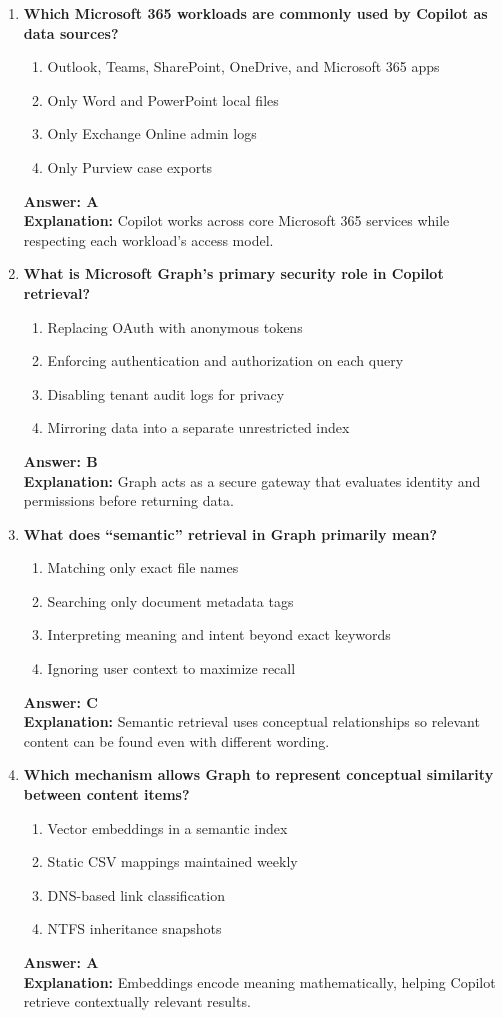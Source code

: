 \documentclass[10pt]{article}
\begin{document}
\begin{enumerate}[leftmargin=*]
\item \textbf{Which Microsoft 365 workloads are commonly used by Copilot as data sources?}
\begin{enumerate}[label=\Alph*.]
  \item Outlook, Teams, SharePoint, OneDrive, and Microsoft 365 apps
  \item Only Word and PowerPoint local files
  \item Only Exchange Online admin logs
  \item Only Purview case exports
\end{enumerate}
\textbf{Answer: A}\\
\textbf{Explanation:} Copilot works across core Microsoft 365 services while respecting each workload’s access model.

\item \textbf{What is Microsoft Graph’s primary security role in Copilot retrieval?}
\begin{enumerate}[label=\Alph*.]
  \item Replacing OAuth with anonymous tokens
  \item Enforcing authentication and authorization on each query
  \item Disabling tenant audit logs for privacy
  \item Mirroring data into a separate unrestricted index
\end{enumerate}
\textbf{Answer: B}\\
\textbf{Explanation:} Graph acts as a secure gateway that evaluates identity and permissions before returning data.

\item \textbf{What does ``semantic'' retrieval in Graph primarily mean?}
\begin{enumerate}[label=\Alph*.]
  \item Matching only exact file names
  \item Searching only document metadata tags
  \item Interpreting meaning and intent beyond exact keywords
  \item Ignoring user context to maximize recall
\end{enumerate}
\textbf{Answer: C}\\
\textbf{Explanation:} Semantic retrieval uses conceptual relationships so relevant content can be found even with different wording.

\item \textbf{Which mechanism allows Graph to represent conceptual similarity between content items?}
\begin{enumerate}[label=\Alph*.]
  \item Vector embeddings in a semantic index
  \item Static CSV mappings maintained weekly
  \item DNS-based link classification
  \item NTFS inheritance snapshots
\end{enumerate}
\textbf{Answer: A}\\
\textbf{Explanation:} Embeddings encode meaning mathematically, helping Copilot retrieve contextually relevant results.


\end{enumerate}
\end{document}

